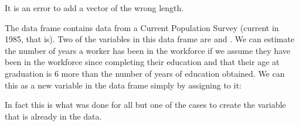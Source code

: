 
It is an error to add a vector of the wrong length.

The  data frame contains data from a Current Population Survey (current in 1985, that is).
Two of the variables in this data frame are  and .  We can estimate
the number of years a worker has been in the workforce if we assume they have been in the workforce
since completing their education and that their age at graduation is 6 more than the number
of years of education obtained.  We can this as a new variable in the data frame simply
by assigning to it:
\begin{knitrout}
\end{knitrout}

In fact this is what was done for all but one of the cases to create the  
variable that is already in the  data.
\begin{knitrout}
\end{knitrout}


